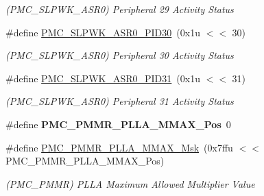\begin{DoxyCompactItemize}
\begin{DoxyCompactList}\small\item\em (P\+M\+C\+\_\+\+S\+L\+P\+W\+K\+\_\+\+A\+S\+R0) Peripheral 29 Activity Status \end{DoxyCompactList}\item 
\mbox{\label{group__SAMS70__PMC_gafdc5a98b12be110e23239c61caa66d52}} 
\#define \mbox{\hyperlink{group__SAMS70__PMC_gafdc5a98b12be110e23239c61caa66d52}{P\+M\+C\+\_\+\+S\+L\+P\+W\+K\+\_\+\+A\+S\+R0\+\_\+\+P\+I\+D30}}~(0x1u $<$$<$ 30)
\begin{DoxyCompactList}\small\item\em (P\+M\+C\+\_\+\+S\+L\+P\+W\+K\+\_\+\+A\+S\+R0) Peripheral 30 Activity Status \end{DoxyCompactList}\item 
\mbox{\label{group__SAMS70__PMC_gab23c1221c3773c42011247533325c5f7}} 
\#define \mbox{\hyperlink{group__SAMS70__PMC_gab23c1221c3773c42011247533325c5f7}{P\+M\+C\+\_\+\+S\+L\+P\+W\+K\+\_\+\+A\+S\+R0\+\_\+\+P\+I\+D31}}~(0x1u $<$$<$ 31)
\begin{DoxyCompactList}\small\item\em (P\+M\+C\+\_\+\+S\+L\+P\+W\+K\+\_\+\+A\+S\+R0) Peripheral 31 Activity Status \end{DoxyCompactList}\item 
\mbox{\label{group__SAMS70__PMC_ga4b43c410ef9a91d3a80ddfb37620a98d}} 
\#define {\bfseries P\+M\+C\+\_\+\+P\+M\+M\+R\+\_\+\+P\+L\+L\+A\+\_\+\+M\+M\+A\+X\+\_\+\+Pos}~0
\item 
\mbox{\label{group__SAMS70__PMC_ga953c032e7a1789cfd1c988f1b8714fe3}} 
\#define \mbox{\hyperlink{group__SAMS70__PMC_ga953c032e7a1789cfd1c988f1b8714fe3}{P\+M\+C\+\_\+\+P\+M\+M\+R\+\_\+\+P\+L\+L\+A\+\_\+\+M\+M\+A\+X\+\_\+\+Msk}}~(0x7ffu $<$$<$ P\+M\+C\+\_\+\+P\+M\+M\+R\+\_\+\+P\+L\+L\+A\+\_\+\+M\+M\+A\+X\+\_\+\+Pos)
\begin{DoxyCompactList}\small\item\em (P\+M\+C\+\_\+\+P\+M\+MR) P\+L\+LA Maximum Allowed Multiplier Value \end{DoxyCompactList}\item 
\mbox{\label{group__SAMS70__PMC_ga13800fa5e46659c40a881c5e77a30fb7}} 
$$
\end{DoxyCompactItemize}
